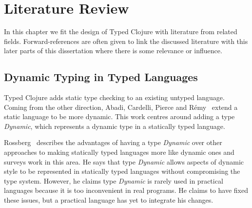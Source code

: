 
\chapter{Literature Review}

In this chapter we fit the design of Typed Clojure with literature from related fields.
Forward-references are often given to link the discussed literature with this later parts
of this dissertation
where there is some relevance or influence.


\section{Dynamic Typing in Typed Languages}

Typed Clojure adds static type checking to an existing untyped language.
Coming from the other direction, Abadi, Cardelli, Pierce and R\'{e}my~\cite{ACPR95}
extend a static language to be more dynamic.
This work centres around adding a type \emph{Dynamic}, which represents
a dynamic type in a statically typed language.

Rossberg~\cite{Ros07} describes the advantages of having a type
\emph{Dynamic} over other approaches to making statically typed languages
more like dynamic ones and surveys work in this area. 
He says that type \emph{Dynamic}
allows aspects of dynamic style to be represented in statically
typed languages without compromising the type system.
However, he claims type \emph{Dynamic} is rarely used in practical languages
because it is too inconvenient in real programs.
He claims to have fixed these issues, but a practical language has yet to integrate
his changes.


